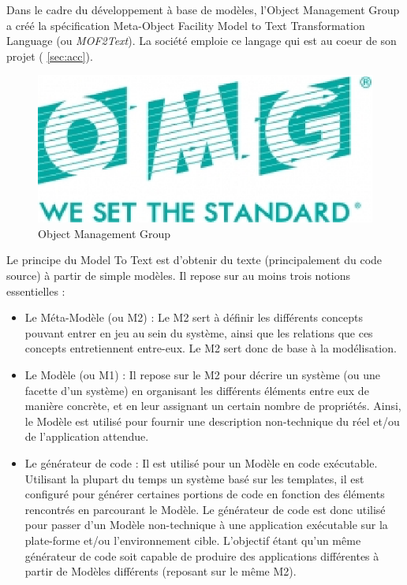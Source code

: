 Dans le cadre du développement à base de modèles, l'Object Management Group \cite{omg} a créé la spécification Meta-Object Facility Model to Text Transformation Language (ou \textit{MOF2Text}). La société \kwobeo{} emploie ce langage qui est au coeur de son projet \kwacceleo{} (\cf{} \ref{sec:acc}).

\begin{figure}[htb]
  \centering
  \includegraphics[scale=.6]{img/omg.eps}
  \caption{Object Management Group}
  \label{fig:omg}
\end{figure}


Le principe du Model To Text est d'obtenir du texte (principalement du code source) à partir de simple modèles.
Il repose sur au moins trois notions essentielles :
\begin{itemize}
\item Le Méta-Modèle (ou M2) : Le M2 sert à définir les différents concepts pouvant entrer en jeu au sein du système, ainsi que les relations que ces concepts entretiennent entre-eux. Le M2 sert donc de base à la modélisation.
\item Le Modèle (ou M1) : Il repose sur le M2 pour décrire un système (ou une facette d'un système) en organisant les différents éléments entre eux de manière concrète, et en leur assignant un certain nombre de propriétés. Ainsi, le Modèle est utilisé pour fournir une description non-technique du réel et/ou de l'application attendue.
\item Le générateur de code : Il est utilisé pour  un Modèle en code exécutable. Utilisant la plupart du temps un système basé sur les templates, il est configuré pour générer certaines portions de code en fonction des éléments rencontrés en parcourant le Modèle. Le générateur de code est donc utilisé pour passer d'un Modèle non-technique à une application exécutable sur la plate-forme et/ou l'environnement cible. L'objectif étant qu'un même générateur de code soit capable de produire des applications différentes à partir de Modèles différents (reposant sur le même M2).\\
\end{itemize}

